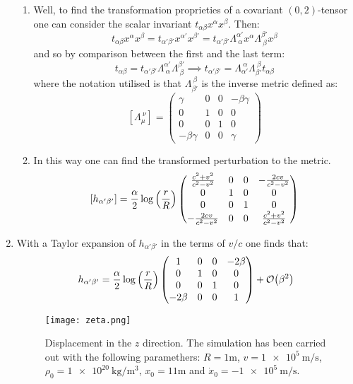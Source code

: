 \documentclass[11pt, oneside]{article}
\begin{document}
\begin{enumerate}
\begin{enumerate}[label=(\alph*)]
	\item Well, to find the transformation proprieties of a covariant $(0,2)$-tensor one can consider the scalar invariant $t_{\alpha\beta}x^{\alpha}x^{\beta}$. Then:
	\[
		t_{\alpha\beta}x^{\alpha}x^{\beta} = t_{\alpha'\beta'}x^{\alpha'}x^{\beta'} = t_{\alpha'\beta'} \Lambda^{\alpha'}_{~\alpha} x^{\alpha}  \Lambda^{\beta'}_{~\beta} x^{\beta}
	\]
	and so by comparison between the first and the last term:
	\[
		t_{\alpha\beta} = t_{\alpha'\beta'} \Lambda^{\alpha'}_{~\alpha}\Lambda^{\beta'}_{~\beta} \implies t_{\alpha'\beta'} = \Lambda^{~\alpha}_{\alpha'} \Lambda^{~\beta}_{\beta'} t_{\alpha\beta}
	\]
	where the notation utilised is that $\Lambda_{\beta'}^{~\beta}$ is the inverse metric defined as:
	\[
		[\Lambda_{\mu}^{~\nu}] = \begin{pmatrix}
			\gamma & 0 & 0 & -\beta \gamma \\
			0 & 1 & 0 & 0 \\
			0 & 0 & 1 & 0 \\
			-\beta \gamma & 0 & 0 & \gamma
		\end{pmatrix}
	\]
	
	\item In this way one can find the transformed perturbation to the metric.
	\[
		[h_{\alpha'\beta'}] = \frac{\alpha}{2} \log \qty(\frac{r}{R}) \begin{pmatrix}
			\frac{c^{2}+v^{2}}{c^{2}-v^{2}} & 0 & 0 & -\frac{2 c v}{c^{2}-v^{2}} \\
			0 & 1 & 0 & 0 \\
			0 & 0 & 1 & 0 \\
			-\frac{2 c v}{c^{2}-v^{2}} & 0 & 0 & \frac{c^{2}+v^{2}}{c^{2}-v^{2}}
		\end{pmatrix}
	\]
	
\end{enumerate}

\item With a Taylor expansion of $h_{\alpha'\beta'}$ in the terms of $v/c$ one finds that:
\[
	h_{\alpha'\beta'} = \frac{\alpha}{2} \log \qty(\frac{r}{R}) \begin{pmatrix}
		1 & 0 & 0 & -2\beta \\
		0 & 1 & 0 & 0 \\
		0 & 0 & 1 & 0 \\
		-2\beta & 0 & 0 & 1
	\end{pmatrix}
	+ \order{\beta^2}
\] 

\begin{figure}[htbp]
   \centering
   \texttt{[image: zeta.png]} %
   \caption{Displacement in the $z$ direction. The simulation has been carried out with the following paramethers: $R=1\si{\meter}$, $v=\SI{1e5}{\meter\per\second}$, $\rho_0 = \SI{1e20}{\kilo\gram\per\meter\cubed}$, $x_0 = 11\si{\meter}$ and $\dot{x}_0 = \SI{-1e5}{\meter\per\second}$.}
   \label{fig:zeta}
\end{figure}


\end{enumerate}
\end{document}

